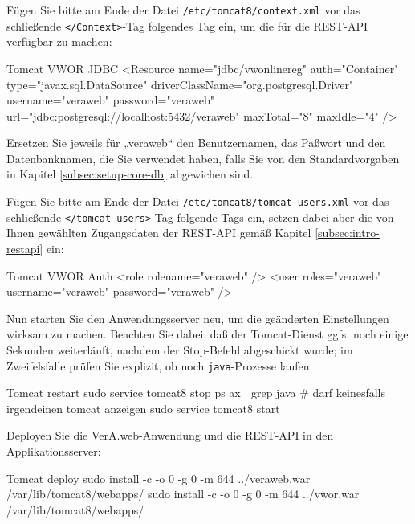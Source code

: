\documentclass{tarentanleitung}
\begin{document}
\begin{minipage}{\linewidth}
Fügen Sie bitte am Ende der Datei \texttt{/etc/tomcat8/context.xml} vor
das schließende \texttt{</Context>}-Tag folgendes Tag ein, um die
für die REST-API verfügbar zu machen:

\begin{lstdump}[language=XML]{Tomcat VWOR JDBC}
<Resource name="jdbc/vwonlinereg" auth="Container" type="javax.sql.DataSource"
 driverClassName="org.postgresql.Driver" username="veraweb" password="veraweb"
 url="jdbc:postgresql://localhost:5432/veraweb" maxTotal="8" maxIdle="4" />
\end{lstdump}

Ersetzen Sie jeweils für „veraweb“ den Benutzernamen, das Paßwort und den
Datenbanknamen, die Sie verwendet haben, falls Sie von den Standardvorgaben
  in Kapitel \ref{subsec:setup-core-db}
abgewichen sind.
\end{minipage}

\begin{minipage}{\linewidth}
Fügen Sie bitte am Ende der Datei \texttt{/etc/tomcat8/tomcat-users.xml} vor
das schließende \texttt{</tomcat-users>}-Tag folgende Tags ein, setzen dabei
aber die von Ihnen gewählten Zugangsdaten der REST-API gemäß Kapitel
\ref{subsec:intro-restapi} ein:

\begin{lstdump}[language=XML]{Tomcat VWOR Auth}
<role rolename="veraweb" />
<user roles="veraweb" username="veraweb" password="veraweb" />
\end{lstdump}
\label{manual:restpw}
\end{minipage}

Nun starten Sie den Anwendungsserver neu, um die geänderten
Einstellungen wirksam zu machen. Beachten Sie dabei, daß der
Tomcat-Dienst ggfs. noch einige Sekunden weiterläuft, nachdem
der Stop-Befehl abgeschickt wurde; im Zweifelsfalle prüfen Sie
explizit, ob noch \texttt{java}-Prozesse laufen.\keinumbruch

\begin{minipage}{\linewidth}
\begin{lstdump}{Tomcat restart}
sudo service tomcat8 stop
ps ax | grep java               # darf keinesfalls irgendeinen tomcat anzeigen
sudo service tomcat8 start
\end{lstdump}
\end{minipage}

\begin{minipage}{\linewidth}
Deployen Sie die VerA.web-Anwendung und die REST-API in den Applikationsserver:

\begin{lstdump}{Tomcat deploy}
sudo install -c -o 0 -g 0 -m 644 ../veraweb.war /var/lib/tomcat8/webapps/
sudo install -c -o 0 -g 0 -m 644 ../vwor.war /var/lib/tomcat8/webapps/
\end{lstdump}
\end{minipage}
\end{document}
